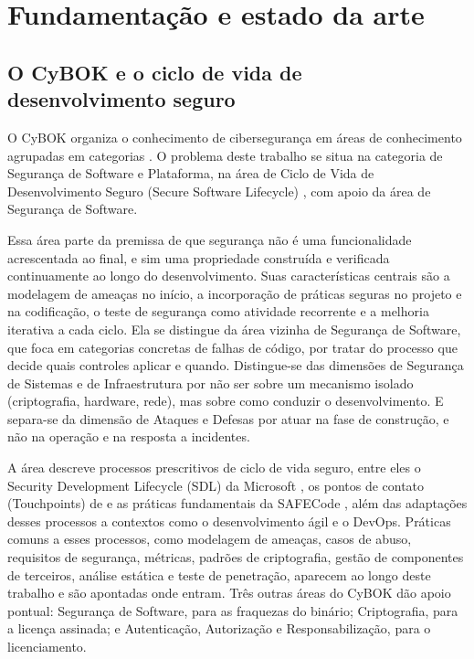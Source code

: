 \section{Fundamentação e estado da arte}
\label{sec:fundamentacao}

\subsection{O CyBOK e o ciclo de vida de desenvolvimento seguro}

O CyBOK organiza o conhecimento de cibersegurança em áreas de conhecimento agrupadas em categorias \parencite{cybok2021}. O problema deste trabalho se situa na categoria de Segurança de Software e Plataforma, na área de Ciclo de Vida de Desenvolvimento Seguro (Secure Software Lifecycle) \parencite{williams2021}, com apoio da área de Segurança de Software.

Essa área parte da premissa de que segurança não é uma funcionalidade acrescentada ao final, e sim uma propriedade construída e verificada continuamente ao longo do desenvolvimento. Suas características centrais são a modelagem de ameaças no início, a incorporação de práticas seguras no projeto e na codificação, o teste de segurança como atividade recorrente e a melhoria iterativa a cada ciclo. Ela se distingue da área vizinha de Segurança de Software, que foca em categorias concretas de falhas de código, por tratar do processo que decide quais controles aplicar e quando. Distingue-se das dimensões de Segurança de Sistemas e de Infraestrutura por não ser sobre um mecanismo isolado (criptografia, hardware, rede), mas sobre como conduzir o desenvolvimento. E separa-se da dimensão de Ataques e Defesas por atuar na fase de construção, e não na operação e na resposta a incidentes.

A área descreve processos prescritivos de ciclo de vida seguro, entre eles o Security Development Lifecycle (SDL) da Microsoft \parencite{howard2006}, os pontos de contato (Touchpoints) de \textcite{mcgraw2006} e as práticas fundamentais da SAFECode \parencite{safecode2018}, além das adaptações desses processos a contextos como o desenvolvimento ágil e o DevOps. Práticas comuns a esses processos, como modelagem de ameaças, casos de abuso, requisitos de segurança, métricas, padrões de criptografia, gestão de componentes de terceiros, análise estática e teste de penetração, aparecem ao longo deste trabalho e são apontadas onde entram. Três outras áreas do CyBOK dão apoio pontual: Segurança de Software, para as fraquezas do binário; Criptografia, para a licença assinada; e Autenticação, Autorização e Responsabilização, para o licenciamento.

